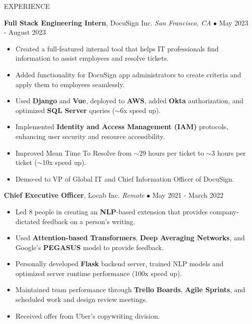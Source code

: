 \documentclass{resume} %
\begin{document}
\begin{rSection}{EXPERIENCE}

\textbf{Full Stack Engineering Intern}, DocuSign Inc. \hfill \textit{San Francisco, CA} $\bullet$ May 2023 - August 2023
\vspace{-2mm}
\begin{itemize}
\itemsep -6pt {}

\item Created a full-featured internal tool that helps IT professionals find information to assist employees and resolve tickets.
\item Added functionality for DocuSign app administrators to create criteria and apply them to employees seamlessly.
\item Used \textbf{Django} and \textbf{Vue}, deployed to \textbf{AWS}, added \textbf{Okta} authorization, and optimized \textbf{SQL Server} queries (\(\sim \)6x speed up).
\item Implemented \textbf{Identity and Access Management (IAM)} protocols, enhancing user security and resource accessibility.
\item Improved Mean Time To Resolve from \(\sim \)29 hours per ticket to \(\sim \)3 hours per ticket (\(\sim \)10x speed up).
\item Demo-ed to VP of Global IT and Chief Information Officer of DocuSign. 

\end{itemize}

\vspace{-1mm}

\textbf{Chief Executive Officer}, Locab Inc. \hfill \textit{Remote} $\bullet$ May 2021 - March 2022
\vspace{-2mm}
\begin{itemize}
\itemsep -6pt {}

\item Led 8 people in creating an \textbf{NLP}-based extension that provides company-dictated feedback on a person’s writing.
\item Used \textbf{Attention-based Transformers}, \textbf{Deep Averaging Networks}, and Google's \textbf{PEGASUS} model to provide feedback.
\item Personally developed \textbf{Flask} backend server, trained NLP models and optimized server runtime performance (100x speed up).
\item Maintained team performance through \textbf{Trello Boards}, \textbf{Agile Sprints}, and scheduled work and design review meetings.
\item Received offer from Uber's copywriting division.


\end{itemize}
\end{rSection}
\end{document}
